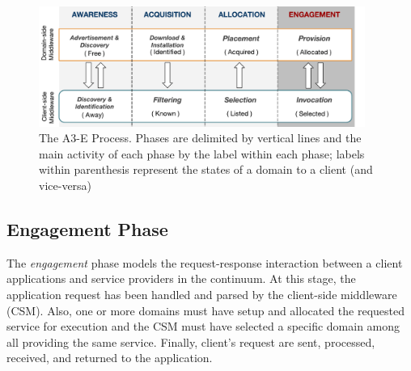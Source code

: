 
\begin{figure}[tbp]
	\includegraphics[width=0.95\textwidth]{figs/A3-E-process}
	\caption{The A3-E Process. Phases are delimited by vertical lines and the main activity of each phase by the label within each phase; labels within parenthesis represent the states of a domain to a client (and vice-versa)}
	\label{fig:A3-E-process}
\end{figure}



\subsection*{Engagement Phase}\label{sec:A3-E-engagement}

The \textit{engagement} phase models the request-response interaction between a client applications and service providers in the continuum. At this stage, the application request has been handled and parsed by the client-side middleware (CSM). Also, one or more domains must have setup and allocated the requested service for execution and the CSM must have selected a specific domain among all providing the same service. Finally, client's request are sent, processed, received, and returned to the application.


